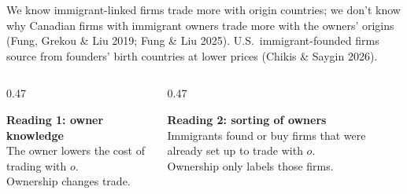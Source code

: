 \documentclass[11pt,aspectratio=169,notes]{beamer}
\newcommand{\ac}[1]{{\color{accent}#1}}
\begin{document}
\begin{frame}{We know immigrant-linked firms trade more with origin countries; we don't know why}
\vspace{0.25cm}
{\small Canadian firms with immigrant owners trade more with the owners' origins (Fung, Grekou \& Liu 2019; Fung \& Liu 2025).
U.S.\ immigrant-founded firms source from founders' birth countries at lower prices (Chikis \& Saygin 2026).}
\vspace{0.4cm}

\begin{columns}[T]
\begin{column}{0.47\textwidth}
\begin{wordsbox}
\textbf{Reading 1: owner knowledge}\\[0.2em]
The owner lowers the cost of trading with $o$.\\
\ac{Ownership changes trade.}
\end{wordsbox}
\end{column}
\begin{column}{0.47\textwidth}
\begin{wordsbox}
\textbf{Reading 2: sorting of owners}\\[0.2em]
Immigrants found or buy firms that were already set up to trade with $o$.\\
\ac{Ownership only labels those firms.}
\end{wordsbox}
\end{column}
\end{columns}
\vspace{0.35cm}
\end{frame}
\end{document}
